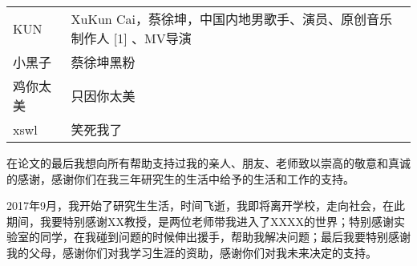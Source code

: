 \documentclass[pdf]{oucthesis}
\begin{document}

\tableofcontents



\mainmatter






%
%
%









\begin{myappendix}
\begin{table}[!hbp]
	\begin{tabular}{p{2cm}p{12cm}}
		KUN & XuKun Cai，蔡徐坤，中国内地男歌手、演员、原创音乐制作人 [1] 、MV导演   \\
		小黑子 & 蔡徐坤黑粉   \\
		鸡你太美 & 只因你太美  \\
		xswl & 笑死我了  \\

	\end{tabular}
\end{table}



\end{myappendix}



\begin{ackonwlegmentback}
在论文的最后我想向所有帮助支持过我的亲人、朋友、老师致以崇高的敬意和真诚的感谢，感谢你们在我三年研究生的生活中给予的生活和工作的支持。

2017年9月，我开始了研究生生活，时间飞逝，我即将离开学校，走向社会，在此期间，我要特别感谢XX教授，是两位老师带我进入了XXXX的世界；特别感谢实验室的同学，在我碰到问题的时候伸出援手，帮助我解决问题；最后我要特别感谢我的父母，感谢你们对我学习生涯的资助，感谢你们对我未来决定的支持。

\end{ackonwlegmentback}
\end{document}
